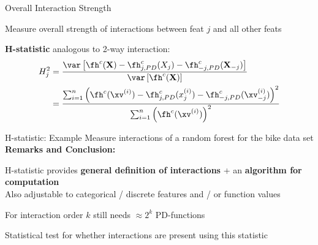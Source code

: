 \documentclass[10pt,compress,t,notes=noshow, xcolor=table]{beamer}
\newcommand{\Xv}{\mathbf{X}} %
\begin{document}
\begin{framei}[align=top]{Overall Interaction Strength}
\item Measure overall strength of interactions between feat $j$ and all other feats
\item[$\Rightarrow$] \textbf{H-statistic} analogous to 2-way interaction:
\begin{align*}
H^2_{j}
& = \frac{
\var \left[ \fh^c(\Xv) - \fh^c_{j, PD}(X_j) - \fh^c_{-j, PD}(\Xv_{-j}) \right]
}{\var \left[ \fh^c(\Xv) \right]} \\
& = \frac{
\sum_{i=1}^n \left( \fh^c(\xv^{(i)}) - \fh^c_{j, PD}(x_j^{(i)}) - \fh^c_{-j, PD}(\xv_{-j}^{(i)}) \right)^2
}{
\sum_{i=1}^n \left( \fh^c(\xv^{(i)}) \right)^2
}
\end{align*}
\end{framei}


\begin{framev}[align=top]{H-statistic: Example}
Measure interactions of a random forest for the bike data set
\pause
\textbf{Remarks and Conclusion:}
\begin{itemizeM}
\item H-statistic provides \textbf{general definition of interactions} + an \textbf{algorithm for computation} \\
Also adjustable to categorical / discrete features and / or function values
\item For interaction order $k$ still needs $\approx 2^k$ PD-functions
\item Statistical test for whether interactions are present using this statistic
\end{itemizeM}
\end{framev}

\endlecture
\end{document}
